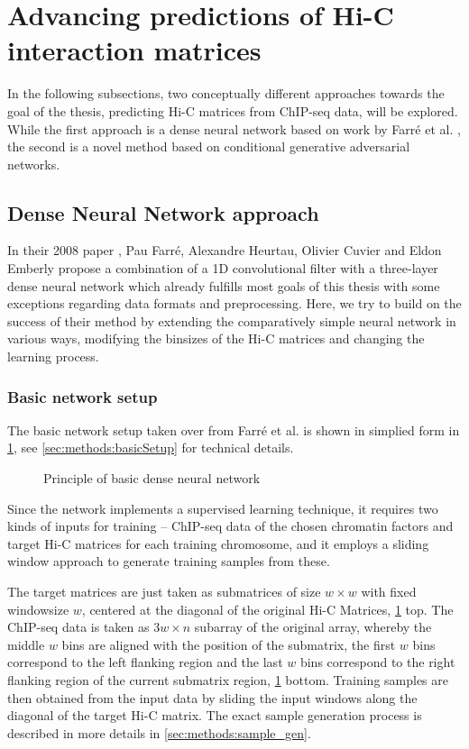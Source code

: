 \section{Advancing predictions of Hi-C interaction matrices}
In the following subsections, two conceptually different approaches towards the goal of the thesis,
predicting Hi-C matrices from ChIP-seq data, will be explored.
While the first approach is a dense neural network based on work by Farr\'e et al. \cite{Farre2018a},
the second is a novel method based on conditional generative adversarial networks.

\subsection{Dense Neural Network approach}\label{sec:DNNapproach}
In their 2008 paper \cite{Farre2018a}, Pau Farr\'e, Alexandre Heurtau, Olivier Cuvier and Eldon Emberly
propose a combination of a 1D convolutional filter with a three-layer dense neural network 
which already fulfills most goals of this thesis with some exceptions regarding data formats and preprocessing.
Here, we try to build on the success of their method by extending the comparatively simple neural network
in various ways, modifying the binsizes of the Hi-C matrices and changing the learning process.

\subsubsection{Basic network setup} \label{sec:improve:basicNetwork}
The basic network setup taken over from Farr\'e et al. \cite{Farre2018a} is shown in simplied form in \cref{fig:improve:priciple_basic_dnn},
see \cref{sec:methods:basicSetup} for technical details.
\begin{figure}[hbp]
    \small
    \centering
    \caption{Principle of basic dense neural network}
    \label{fig:improve:priciple_basic_dnn}
\end{figure}

Since the network implements a supervised learning technique,
it requires two kinds of inputs for training -- ChIP-seq data of the chosen chromatin factors and
target Hi-C matrices for each training chromosome, and it employs a sliding window approach 
to generate training samples from these.

The target matrices are just taken as submatrices of size $w \times w$ 
with fixed windowsize $w$, centered at the diagonal of the 
original Hi-C Matrices, \cref{fig:improve:priciple_basic_dnn} top.
The ChIP-seq data is taken as $3w \times n$ subarray of the original array,
whereby the middle $w$ bins are aligned with the position of the submatrix,
the first $w$ bins correspond to the left flanking region and the last $w$ bins correspond to 
the right flanking region of the current submatrix region, \cref{fig:improve:priciple_basic_dnn} bottom. 
Training samples are then obtained from the input data by sliding 
the input windows along the diagonal of the target Hi-C matrix. 
The exact sample generation process is described in more details in \cref{sec:methods:sample_gen}.

